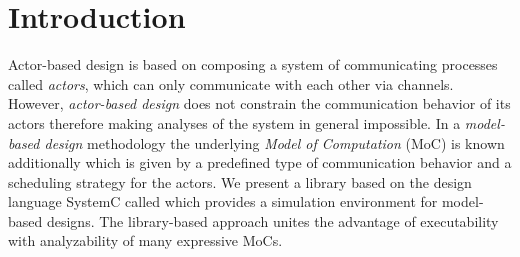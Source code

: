 \chapter{Introduction}\label{sec:intro}

Actor-based design is based on composing a system of communicating processes called \emph{actors}, which can only communicate with each other via channels.
However, \emph{actor-based design} does not constrain the communication behavior of its actors therefore making analyses of the system in general impossible.
In a \emph{model-based design} methodology the underlying \emph{Model of Computation} (MoC) is known additionally which is given by a predefined type of communication behavior and a scheduling strategy for the actors.
We present a library based on the design language SystemC called \SysteMoC{} which provides a simulation environment for model-based designs.
The library-based approach unites the advantage of executability with analyzability of many expressive MoCs.

